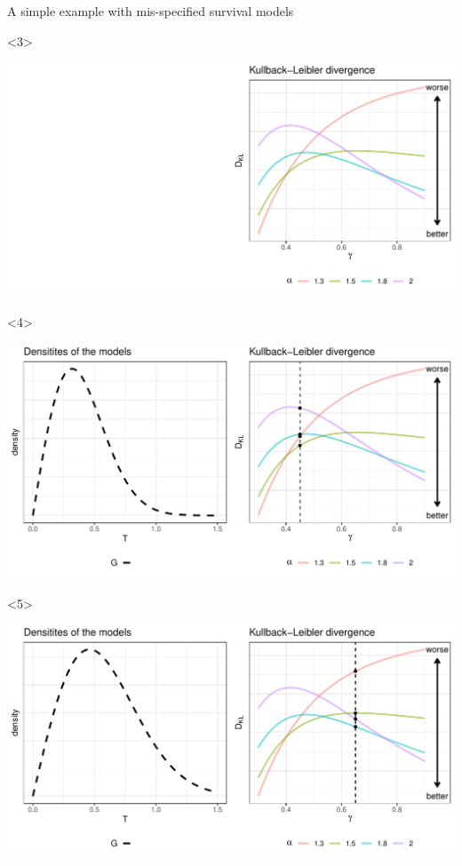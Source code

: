 \documentclass[smaller]{beamer}\usepackage{listings}
\begin{document}
\begin{frame}[label={sec:orgef7fe10}]{A simple example with mis-specified survival models}
\begin{onlyenv}<3>
\begin{center}
\includegraphics[width=.9\linewidth]{fig-mix-const-v3.pdf}
\end{center}
\end{onlyenv}


\begin{onlyenv}<4>
\begin{center}
\includegraphics[width=.9\linewidth]{fig-mix-const-v4.pdf}
\end{center}
\end{onlyenv}

\begin{onlyenv}<5>
\begin{center}
\includegraphics[width=.9\linewidth]{fig-mix-const-v5.pdf}
\end{center}
\end{onlyenv}
\end{frame}
\end{document}
